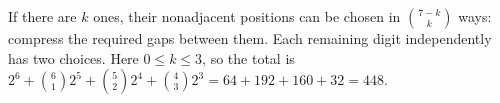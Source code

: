 If there are $k$ ones, their nonadjacent positions can be chosen in $\binom{7-k}{k}$ ways: compress the required gaps between them. Each remaining digit independently has two choices. Here $0\le k\le 3$, so the total is $2^6+\binom 61 2^5+\binom 52 2^4+\binom 43 2^3=64+192+160+32=\boxed{448}$.
